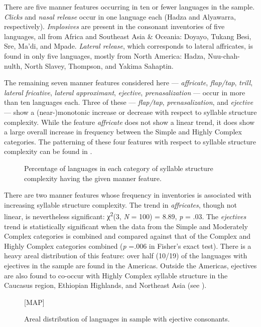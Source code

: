   There are five manner features occurring in ten or fewer languages in the sample. \textit{Clicks} and \textit{nasal release} occur in one language each (Hadza and Alyawarra, respectively). \textit{Implosives} are present in the consonant inventories of five languages, all from Africa and Southeast Asia \& Oceania: Doyayo, Tukang Besi, Sre, Ma’di, and Mpade. \textit{Lateral release}, which corresponds to lateral affricates, is found in only five languages, mostly from North America: Hadza, Nuu-chah-nulth, North Slavey, Thompson, and Yakima Sahaptin.

  The remaining seven manner features considered here — \textit{affricate}, \textit{flap/tap}, \textit{trill}, \textit{lateral fricative}, \textit{lateral approximant}, \textit{ejective}, \textit{prenasalization} — occur in more than ten languages each. Three of these —  \textit{flap/tap}, \textit{prenasalization}, and \textit{ejective} — show a (near-)monotonic increase or decrease with respect to syllable structure complexity. While the feature \textit{affricate} does not show a linear trend, it does show a large overall increase in frequency between the Simple and Highly Complex categories. The patterning of these four features with respect to syllable structure complexity can be found in .

\begin{figure}
\caption{\label{fig:4.13} Percentage of languages in each category of syllable structure complexity having the given manner feature.}
\end{figure}

  There are two manner features whose frequency in inventories is associated with increasing syllable structure complexity. The trend in \textit{affricates}, though not linear, is nevertheless significant: χ\textsuperscript{2}(3, \textit{N} = 100) = 8.89, \textit{p} = .03. The \textit{ejectives} trend is statistically significant when the data from the Simple and Moderately Complex categories is combined and compared against that of the Complex and Highly Complex categories combined (\textit{p} =.006 in Fisher’s exact test). There is a heavy areal distribution of this feature: over half (10/19) of the languages with ejectives in the sample are found in the Americas. Outside the Americas, ejectives are also found to co-occur with Highly Complex syllable structure in the Caucasus region, Ethiopian Highlands, and Northeast Asia (see ).


\begin{figure}  
{}[MAP]

\caption{\label{fig:4.14} Areal distribution of languages in sample with ejective consonants.}
\end{figure}

